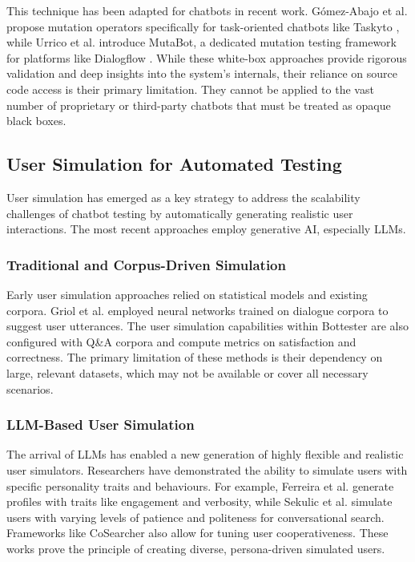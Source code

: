 This technique has been adapted for chatbots in recent work.
Gómez-Abajo et al. \autocite{gomez-abajoMutationTestingTaskOriented2024}
propose mutation operators specifically for task-oriented chatbots like Taskyto \autocite{sanchezcuadradoAutomatingDevelopmentTaskoriented2024},
while Urrico et al. \autocite{urricoMutaBotMutationTesting2024} introduce MutaBot,
a dedicated mutation testing framework for platforms like Dialogflow \autocite{Dialogflow}.
While these white-box approaches provide rigorous validation
and deep insights into the system's internals,
their reliance on source code access
is their primary limitation.
They cannot be applied to the vast number of
proprietary or third-party chatbots
that must be treated as opaque black boxes.

\subsection{User Simulation for Automated Testing}

User simulation has emerged as a key strategy to
address the scalability challenges of chatbot testing
by automatically generating realistic user interactions.
The most recent approaches employ generative \acl{AI},
especially \acp {LLM}.

\subsubsection{Traditional and Corpus-Driven Simulation}

Early user simulation approaches
relied on statistical models and existing corpora.
Griol et al. \autocite{griolAutomaticDialogSimulation2013}
employed neural networks trained on dialogue corpora
to suggest user utterances.
The user simulation capabilities within Bottester
\autocite{vasconcelosBottesterTestingConversational2017}
are also configured with Q\&A corpora
and compute metrics on satisfaction and correctness.
The primary limitation of these methods is
their dependency on large, relevant datasets,
which may not be available or cover all necessary scenarios.

\subsubsection{LLM-Based User Simulation}

The arrival of \acp{LLM} has enabled a new generation
of highly flexible and realistic user simulators.
Researchers have demonstrated the ability
to simulate users with specific personality traits and behaviours.
For example, Ferreira et al. \autocite{ferreiraMultitraitUserSimulation2024}
generate profiles with traits like engagement and verbosity,
while Sekulic et al. \autocite{sekulicSimulatingConversationalSearch2024}
simulate users with varying levels of patience and politeness for conversational search.
Frameworks like CoSearcher \autocite{salleStudyingEffectivenessConversational2021}
also allow for tuning user cooperativeness.
These works prove the principle of creating diverse, persona-driven simulated users.

